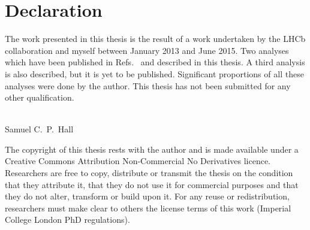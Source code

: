 \clearpage
\chapter*{\centering Declaration}

\begin{center}
  {\setlength{\currentparskip}{\parskip}%
  \begin{minipage}{\abstractpagewidth}
    \setlength{\parskip}{\currentparskip}%
    The work presented in this thesis is the result of a work undertaken by the
    LHCb collaboration and myself between January 2013 and June 2015.
    Two analyses which have been
    published in Refs.~\cite{LHCb-PAPER-2012-025,LHCb-PAPER-2014-030} and described in this thesis.
    A third analysis is also described, but it is yet to be published.
    Significant proportions of all these analyses were done by the author.
    This thesis has not been submitted for any other qualification.
    \\\\
    \begin{flushright}
      Samuel C.~P.~Hall\\
      \shortdate
    \end{flushright}
  \end{minipage}

    \vfill

  \begin{minipage}{0.8\textwidth}
    \footnotesize
    The copyright of this thesis rests with the author and is made available under a Creative
    Commons Attribution Non-Commercial No Derivatives licence. Researchers are free to copy,
    distribute or transmit the thesis on the condition that they attribute it, that they do not use
    it for commercial purposes and that they do not alter, transform or build upon it. For any
    reuse or redistribution, researchers must make clear to others the license terms of this work
    (Imperial College London PhD regulations).
  \end{minipage}}
  \vspace{1.0cm}
\end{center}
